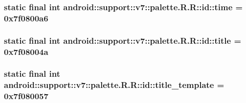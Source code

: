 \hypertarget{classandroid_1_1support_1_1v7_1_1palette_1_1_r_1_1id_2303038286d3d069190d1c8615dd9378}{
\subsubsection[{time}]{\setlength{\rightskip}{0pt plus 5cm}static final int android::support::v7::palette.R.R::id::time = 0x7f0800a6}}
\label{classandroid_1_1support_1_1v7_1_1palette_1_1_r_1_1id_2303038286d3d069190d1c8615dd9378}


\hypertarget{classandroid_1_1support_1_1v7_1_1palette_1_1_r_1_1id_6fa97318920cf33a22d5953b202ab7a7}{
\subsubsection[{title}]{\setlength{\rightskip}{0pt plus 5cm}static final int android::support::v7::palette.R.R::id::title = 0x7f08004a}}
\label{classandroid_1_1support_1_1v7_1_1palette_1_1_r_1_1id_6fa97318920cf33a22d5953b202ab7a7}


\hypertarget{classandroid_1_1support_1_1v7_1_1palette_1_1_r_1_1id_c4f5ce9052ce0f9ed7d9ae4b570122c4}{
\subsubsection[{title\_\-template}]{\setlength{\rightskip}{0pt plus 5cm}static final int android::support::v7::palette.R.R::id::title\_\-template = 0x7f080057}}
\label{classandroid_1_1support_1_1v7_1_1palette_1_1_r_1_1id_c4f5ce9052ce0f9ed7d9ae4b570122c4}


